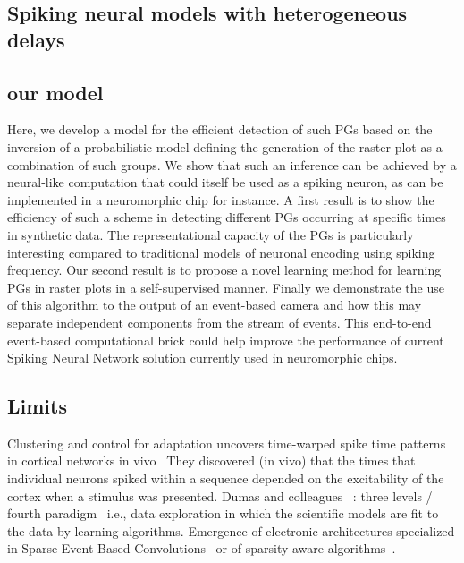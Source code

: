 \documentclass[brainsci, %
               review,submit,pdftex,moreauthors%
               ]{Definitions/mdpi}
\begin{document}
\subsection{Spiking neural models with heterogeneous delays}
\subsection{our model}\label{our-model}
Here, we develop a model for the efficient detection of such PGs based on the inversion of a probabilistic model defining the generation of the raster plot as a combination of such groups. We show that such an inference can be achieved by a neural-like computation that could itself be used as a spiking neuron, as can be implemented in a neuromorphic chip for instance. A first result is to show the efficiency of such a scheme in detecting different PGs occurring at specific times in synthetic data. The representational capacity of the PGs is particularly interesting compared to traditional models of neuronal encoding using spiking frequency. Our second result is to propose a novel learning method for learning PGs in raster plots in a self-supervised manner. Finally we demonstrate the use of this algorithm to the output of an event-based camera and how this may separate independent components from the stream of events. This end-to-end event-based computational brick could help improve the performance of current Spiking Neural Network solution currently used in neuromorphic chips.


\subsection{Limits}

Clustering and control for adaptation uncovers time-warped spike time patterns in cortical networks in vivo~\citep{Isbister} They discovered (in vivo) that the times that individual neurons spiked within a sequence depended on the excitability of the cortex when a stimulus was presented.
Dumas and colleagues~\citep{panahi_generative_2021} : three levels / fourth paradigm~\citep{tolle_fourth_2011} i.e., data exploration in which the scientific models are fit to the data by learning algorithms.
Emergence of electronic architectures specialized in Sparse Event-Based Convolutions~\citep{di_mauro_alfio_sne_2022} or of sparsity aware algorithms~\citep{yin_sata_2022}.
\end{document}
